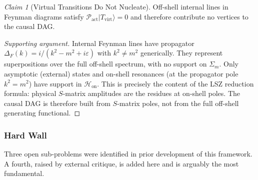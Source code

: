\documentclass[11pt,a4paper]{article}
\theoremstyle{plain}
\theoremstyle{definition}
\theoremstyle{remark}
\newtheorem{claim}[theorem]{Claim}
\newcommand{\Pact}{\mathcal{P}_{\mathrm{act}}}
\newcommand{\Hon}{\mathcal{H}_{\mathrm{on}}}
\newcommand{\Sigmam}{\Sigma_{m}}
\newcommand{\ket}[1]{|#1\rangle}
\begin{document}
\begin{claim}[Virtual Transitions Do Not Nucleate]
Off-shell internal lines in Feynman diagrams satisfy $\Pact\ket{T_{\mathrm{virt}}}
= 0$ and therefore contribute no vertices to the causal DAG.
\end{claim}

\begin{proof}[Supporting argument]
Internal Feynman lines have propagator $\Delta_{F}(k) = i/(k^{2} - m^{2} +
i\varepsilon)$ with $k^{2} \neq m^{2}$ generically. They represent superpositions
over the full off-shell spectrum, with no support on $\Sigmam$. Only asymptotic
(external) states and on-shell resonances (at the propagator pole $k^{2} = m^{2}$)
have support in $\Hon$. This is precisely the content of the LSZ reduction formula:
physical $S$-matrix amplitudes are the residues at on-shell poles. The causal DAG
is therefore built from $S$-matrix poles, not from the full off-shell generating
functional.
\end{proof}

\subsubsection{Hard Wall}
\label{sec:hardwall}

Three open sub-problems were identified in prior development of this framework.
A fourth, raised by external critique, is added here and is arguably the most
fundamental.
\end{document}
